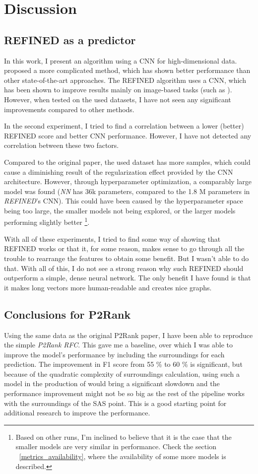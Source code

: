 \chapter{Discussion}

\section{REFINED as a predictor}
In this work, I present an algorithm using a \ac{CNN} for high-dimensional data. \cite{REFINED} proposed a more complicated method, which has shown better performance than other state-of-the-art approaches. The REFINED algorithm uses a CNN, which has been shown to improve results mainly on image-based tasks (such as \cite{AlexNet}). However, when tested on the used datasets, I have not seen any significant improvements compared to other methods.

In the second experiment, I tried to find a correlation between a lower (better) REFINED score and better CNN performance. However, I have not detected any correlation between these two factors.

Compared to the original paper, the used dataset has more samples, which could cause a diminishing result of the regularization effect provided by the CNN architecture. However, through hyperparameter optimization, a comparably large model was found (\textit{NN} has 36k parameters, compared to the 1.8 M parameters in \textit{REFINED}'s CNN). This could have been caused by the hyperparameter space being too large, the smaller models not being explored, or the larger models performing slightly better \footnote{Based on other runs, I'm inclined to believe that it is the case that the smaller models are very similar in performance. Check the section ~\ref{metrics_availability}, where the availability of some more models is described.}.

With all of these experiments, I tried to find some way of showing that REFINED works or that it, for some reason, makes sense to go through all the trouble to rearrange the features to obtain some benefit. But I wasn't able to do that. With all of this, I do not see a strong reason why such REFINED should outperform a simple, dense neural network. The only benefit I have found is that it makes long vectors more human-readable and creates nice graphs.

\section{Conclusions for P2Rank}

Using the same data as the original P2Rank paper, I have been able to reproduce the simple \textit{P2Rank RFC}. This gave me a baseline, over which I was able to improve the model's performance by including the surroundings for each prediction. The improvement in F1 score from 55 \% to 60 \% is significant, but because of the quadratic complexity of surroundings calculation, using such a model in the production of \cite{prankweb} would bring a significant slowdown and the performance improvement might not be so big as the rest of the pipeline works with the surroundings of the \ac{SAS} point. This is a good starting point for additional research to improve the performance.